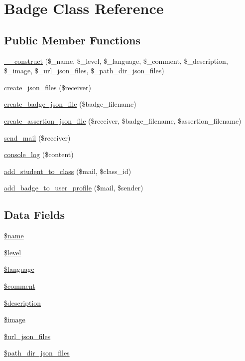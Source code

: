 \hypertarget{class_badge}{}\section{Badge Class Reference}
\label{class_badge}
\subsection*{Public Member Functions}
\begin{DoxyCompactItemize}
\item 
\hyperlink{class_badge_a5abb1a8e6e6c187ee5fdb8774af99571}{\+\_\+\+\_\+construct} (\$\+\_\+name, \$\+\_\+level, \$\+\_\+language, \$\+\_\+comment, \$\+\_\+description, \$\+\_\+image, \$\+\_\+url\+\_\+json\+\_\+files, \$\+\_\+path\+\_\+dir\+\_\+json\+\_\+files)
\item 
\hyperlink{class_badge_ae110d2fe3ba285589a45fa5bcc9be1c1}{create\+\_\+json\+\_\+files} (\$receiver)
\item 
\hyperlink{class_badge_ad98322bc6a8bafcfb74341b412c6d79e}{create\+\_\+badge\+\_\+json\+\_\+file} (\$badge\+\_\+filename)
\item 
\hyperlink{class_badge_a95417bf38dbd4d414a24a7e4d795ee27}{create\+\_\+assertion\+\_\+json\+\_\+file} (\$receiver, \$badge\+\_\+filename, \$assertion\+\_\+filename)
\item 
\hyperlink{class_badge_a64c3041fe3d488c19cc5461a0af0c353}{send\+\_\+mail} (\$receiver)
\item 
\hyperlink{class_badge_acd17df0ee44fc371bb3ef0be07525ddb}{console\+\_\+log} (\$content)
\item 
\hyperlink{class_badge_aa01bda205ac1364ddd4ab38d96336bd0}{add\+\_\+student\+\_\+to\+\_\+class} (\$mail, \$class\+\_\+id)
\item 
\hyperlink{class_badge_ade99eab50004c9c474a8d0640f6c59f8}{add\+\_\+badge\+\_\+to\+\_\+user\+\_\+profile} (\$mail, \$sender)
\end{DoxyCompactItemize}
\subsection*{Data Fields}
\begin{DoxyCompactItemize}
\item 
\hyperlink{class_badge_ab2fc40d43824ea3e1ce5d86dee0d763b}{\$name}
\item 
\hyperlink{class_badge_abd32cc82c6a3f79491987de36ad580ca}{\$level}
\item 
\hyperlink{class_badge_a83170d318260a5a2e2a79dccdd371b10}{\$language}
\item 
\hyperlink{class_badge_a536677acc0163c53c067316a97456e6c}{\$comment}
\item 
\hyperlink{class_badge_a87b032cba06009e3467abf1c8018d960}{\$description}
\item 
\hyperlink{class_badge_aac6146b4cdec66c94263ddb55afd5946}{\$image}
\item 
\hyperlink{class_badge_aca6b9b407b17891eb273161b37bd3e22}{\$url\+\_\+json\+\_\+files}
\item 
\hyperlink{class_badge_a7a43ee957df14b549b2719c20fc8122f}{\$path\+\_\+dir\+\_\+json\+\_\+files}
\end{DoxyCompactItemize}


